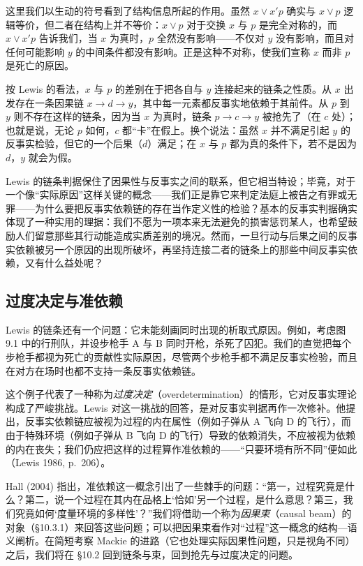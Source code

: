 这里我们以生动的符号看到了结构信息所起的作用。虽然 $x\vee x'p$ 确实与 $x\vee p$ 逻辑等价，但二者在结构上并不等价：$x\vee p$ 对于交换 $x$ 与 $p$ 是完全对称的，而 $x\vee x'p$ 告诉我们，当 $x$ 为真时，$p$ 全然没有影响——不仅对 $y$ 没有影响，而且对任何可能影响 $y$ 的中间条件都没有影响。正是这种不对称，使我们宣称 $x$ 而非 $p$ 是死亡的原因。

按 Lewis 的看法，$x$ 与 $p$ 的差别在于把各自与 $y$ 连接起来的链条之性质。从 $x$ 出发存在一条因果链 $x\to d\to y$，其中每一元素都反事实地依赖于其前件。从 $p$ 到 $y$ 则不存在这样的链条，因为当 $x$ 为真时，链条 $p\to c\to y$ 被抢先了（在 $c$ 处）；也就是说，无论 $p$ 如何，$c$ 都“卡”在假上。换个说法：虽然 $x$ 并不满足引起 $y$ 的反事实检验，但它的一个后果（$d$）满足；在 $x$ 与 $p$ 都为真的条件下，若不是因为 $d$，$y$ 就会为假。

Lewis 的链条判据保住了因果性与反事实之间的联系，但它相当特设；毕竟，对于一个像“实际原因”这样关键的概念——我们正是靠它来判定法庭上被告之有罪或无罪——为什么要把反事实依赖链的存在当作定义性的检验？基本的反事实判据确实体现了一种实用的理据：我们不愿为一项本来无法避免的损害惩罚某人，也希望鼓励人们留意那些其行动能造成实质差别的境况。然而，一旦行动与后果之间的反事实依赖被另一个原因的出现所破坏，再坚持连接二者的链条上的那些中间反事实依赖，又有什么益处呢？

\subsection{过度决定与准依赖}

Lewis 的链条还有一个问题：它未能刻画同时出现的析取式原因。例如，考虑图 9.1 中的行刑队，并设步枪手 A 与 B 同时开枪，杀死了囚犯。我们的直觉把每个步枪手都视为死亡的贡献性实际原因，尽管两个步枪手都不满足反事实检验，而且在对方在场时也都不支持一条反事实依赖链。

这个例子代表了一种称为\emph{过度决定}（overdetermination）的情形，它对反事实理论构成了严峻挑战。Lewis 对这一挑战的回答，是对反事实判据再作一次修补。他提出，反事实依赖链应被视为过程的内在属性（例如子弹从 A 飞向 D 的飞行），而由于特殊环境（例如子弹从 B 飞向 D 的飞行）导致的依赖消失，不应被视为依赖的内在丧失；我们仍应把这样的过程算作准依赖的——“只要环境有所不同”便如此（Lewis 1986, p.~206）。

Hall (2004) 指出，准依赖这一概念引出了一些棘手的问题：“第一，过程究竟是什么？第二，说一个过程在其内在品格上‘恰如’另一个过程，是什么意思？第三，我们究竟如何‘度量环境的多样性’？”我们将借助一个称为\emph{因果束}（causal beam）的对象（\S 10.3.1）来回答这些问题；可以把因果束看作对“过程”这一概念的结构—语义阐析。在简短考察 Mackie 的进路（它也处理实际因果性问题，只是视角不同）之后，我们将在 \S 10.2 回到链条与束，回到抢先与过度决定的问题。

